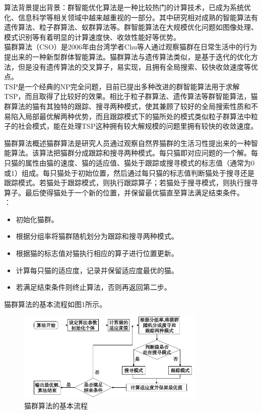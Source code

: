 \documentclass[UTF8]{ctexart}
\begin{document}
\newpage
\setcounter{page}{1}
\begin{section}
{算法背景}\indent 提出背景：群智能优化算法是一种比较热门的计算技术，已成为系统优化、信息科学等相关领域中越来越重视的一部分。其中研究相对成熟的智能算法有遗传算法、粒子群算法、蚁群算法等。群智能算法在大规模优化问题如图像处理、模式识别等有着明显的计算速度快、收敛性能好等优势。\\ \indent 猫群算法（CSO）是2006年由台湾学者Chu等人通过观察猫群在日常生活中的行为提出来的一种新型群体智能算法。猫群算法与遗传算法类似，是基于迭代的优化方法，但是没有遗传算法的交叉算子，易实现，且拥有全局搜索、较快收敛速度等优点。\\ \indent TSP是一个经典的NP完全问题，目前已提出多种改进的群智能算法用于求解TSP，而且取得了比较好的效果。相比于粒子群算法、遗传算法等群智能算法，猫群算法的猫有其独特的跟踪、搜寻两种模式，使其兼顾了较好的全局搜索性质和不易陷入局部最优解两种优势，而且跟踪模式下的猫所处的模式类似粒子群算法中粒子的社会模式，能在处理TSP这种拥有较大解规模的问题里拥有较快的收敛速度。
\end{section}
\begin{section}
{猫群算法概述}\indent 猫群算法是研究人员通过观察自然界猫群的生活习性提出来的一种智能算法。该算法把猫群分成跟踪和搜寻两种模式。每只猫即对应问题的一个解。每只猫的属性由猫的速度、猫的适应值、猫处于跟踪或搜寻模式的标志值（通常为0或1）组成。每只猫处于初始位置，然后通过每只猫的标志值判断猫处于搜寻还是跟踪模式。若猫处于跟踪模式，则执行跟踪算子；若猫处于搜寻模式，则执行搜寻算子。最后使得猫处于一个新的位置，并保留最优猫直至算法满足结束条件。\\ ：\\

\begin{itemize}
	\item{初始化猫群。}
	\item{根据分组率将猫群随机划分为跟踪和搜寻两种模式。}
	\item{根据猫的标志值对猫执行相应的算子进行位置更新。}
	\item{计算每只猫的适应度，记录并保留适应度最优的猫。}
	\item{若满足结束条件则终止算法，否则再返回第二步。}
\end{itemize}
\indent 猫群算法的基本流程如图1所示。
\begin{figure}[htbp]
	\centering
	\includegraphics[width=0.8\textwidth]{pic/cat1.png}
	\caption{猫群算法的基本流程}
\end{figure}
\end{section}
\end{document}
